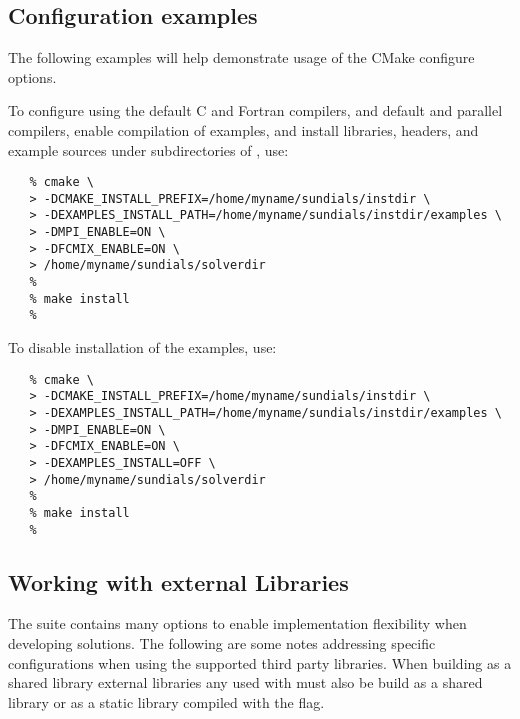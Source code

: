 
\subsection{Configuration examples}

The following examples will help demonstrate usage of the CMake configure options.

\noindent To configure {\sundials} using the default C and Fortran compilers,
and default  and  parallel compilers, 
enable compilation of examples, and install libraries, headers, and
example sources under subdirectories of
, use:

\begin{verbatim}
   % cmake \
   > -DCMAKE_INSTALL_PREFIX=/home/myname/sundials/instdir \
   > -DEXAMPLES_INSTALL_PATH=/home/myname/sundials/instdir/examples \
   > -DMPI_ENABLE=ON \
   > -DFCMIX_ENABLE=ON \
   > /home/myname/sundials/solverdir
   %
   % make install
   % 
\end{verbatim}

\noindent To disable installation of the examples, use:
\begin{verbatim}
   % cmake \
   > -DCMAKE_INSTALL_PREFIX=/home/myname/sundials/instdir \
   > -DEXAMPLES_INSTALL_PATH=/home/myname/sundials/instdir/examples \
   > -DMPI_ENABLE=ON \
   > -DFCMIX_ENABLE=ON \
   > -DEXAMPLES_INSTALL=OFF \
   > /home/myname/sundials/solverdir
   %
   % make install
   % 
\end{verbatim}

\subsection{Working with external Libraries} \label{ss:externallibs}

The {\sundials} suite contains many options to enable implementation flexibility
when developing solutions. The following are some notes addressing specific configurations
when using the supported third party libraries.
When building {\sundials} as a shared library external libraries any
used with {\sundials} must also be build as a shared library or as a
static library compiled with the  flag.{\warn}

